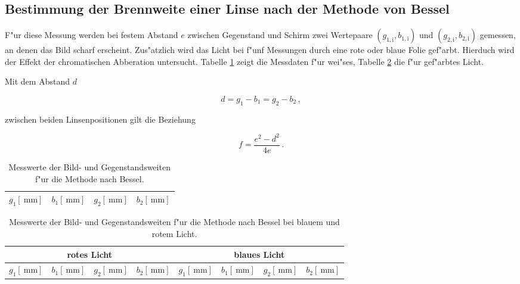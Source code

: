 	\clearpage

	\subsection{Bestimmung der Brennweite einer Linse nach der Methode von Bessel}
		\label{subsec:bessel}
		F"ur diese Messung werden bei festem Abstand $e$ zwischen Gegenstand und Schirm zwei Wertepaare $(g_{1,\mathrm{i}}, b_{1,\mathrm{i}})$ und $(g_{2,\mathrm{i}}, b_{2,\mathrm{i}})$ gemessen, an denen das Bild scharf erscheint.
		Zus"atzlich wird das Licht bei f"unf Messungen durch eine rote oder blaue Folie gef"arbt.
		Hierduch wird der Effekt der chromatischen Abberation untersucht.
		Tabelle \ref{tabelle:bessel} zeigt die Messdaten f"ur wei"ses, Tabelle \ref{tabelle:farbe} die f"ur gef"arbtes Licht.

		Mit dem Abstand $d$

		\begin{equation*}
			d = g_1 - b_1 = g_2 - b_2 \, ,
		\end{equation*}

		zwischen beiden Linsenpositionen gilt die Beziehung

		\begin{equation}
			f = \frac{e^2 - d^2}{4e} \, .
		\end{equation}

		\begin{table}[!h]
			\begin{center}
				\label{tabelle:bessel}
				\caption{Messwerte der Bild- und Gegenstandsweiten f"ur die Methode nach Bessel.}
				\begin{tabular}{|c|c|c|c|}
					\hline 
					$g_1 [\SI{}{\milli \meter}]$ & $b_1 [\SI{}{\milli \meter}]$ & $g_2 [\SI{}{\milli \meter}]$ & $b_2 [\SI{}{\milli \meter}]$ \\
					\hline 
					\hline
					
					\hline 
				\end{tabular}
			\end{center}
		\end{table}

		\begin{table}[!h]
			\begin{center}
				\label{tabelle:farbe}
				\caption{Messwerte der Bild- und Gegenstandsweiten f"ur die Methode nach Bessel bei blauem und rotem Licht.}
				\begin{tabular}{|c|c|c|c||c|c|c|c|}
					\hline 
					\multicolumn{4}{|c||}{rotes Licht} & \multicolumn{4}{c|}{blaues Licht} \\
					\hline
					$g_1 [\SI{}{\milli \meter}]$ & $b_1 [\SI{}{\milli \meter}]$ & $g_2 [\SI{}{\milli \meter}]$ & $b_2 [\SI{}{\milli \meter}]$ & $g_1 [\SI{}{\milli \meter}]$ & $b_1 [\SI{}{\milli \meter}]$ & $g_2 [\SI{}{\milli \meter}]$ & $b_2 [\SI{}{\milli \meter}]$ \\
					\hline 
					\hline
					
					\hline 
				\end{tabular}
			\end{center}
		\end{table}

